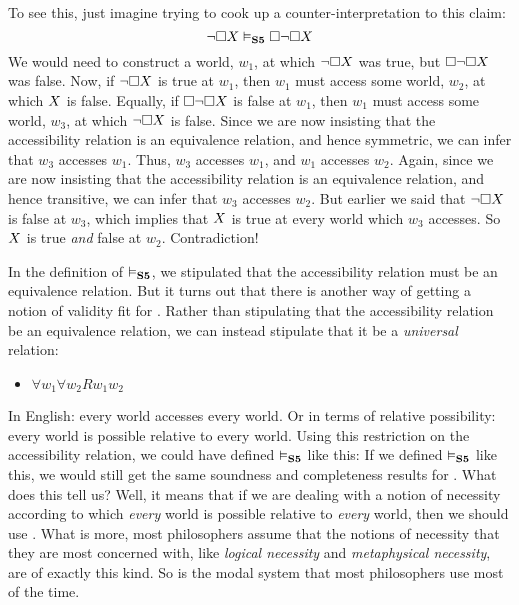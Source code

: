 To see this, just imagine trying to cook up a counter-interpretation to this claim:
\[
	\neg\Box X \vDash_{\mathbf{S5}}  \Box \neg\Box X
\]
We would need to construct a world, $w_1$, at which $\neg\Box X$ was true, but $\Box \neg\Box X$ was false. 
Now, if $\neg\Box X$ is true at $w_1$, then $w_1$ must access some world, $w_2$, at which $X$ is false. Equally, if $\Box \neg\Box X$ is false at $w_1$, then $w_1$ must access some world, $w_3$, at which $\neg\Box X$ is false. Since we are now insisting that the accessibility relation is an equivalence relation, and hence symmetric, we can infer that $w_3$ accesses $w_1$. Thus, $w_3$ accesses $w_1$, and $w_1$ accesses $w_2$. Again, since we are now insisting that the accessibility relation is an equivalence relation, and hence transitive, we can infer that $w_3$ accesses $w_2$. But earlier we said that $\neg\Box X$ is false at $w_3$, which implies that $X$ is true at every world which $w_3$ accesses. So $X$ is true \emph{and} false at $w_2$. Contradiction!

In the definition of $\vDash_{\mathbf{S5}} $, we stipulated that the accessibility relation must be an equivalence relation. But it turns out that there is another way of getting a notion of validity fit for \mlSfive. Rather than stipulating that the accessibility relation be an equivalence relation, we can instead stipulate that it be a \emph{universal} relation:
\begin{itemize}
	\item $\forall w_1\forall w_2Rw_1w_2$
\end{itemize}
In English: every world accesses every world. Or in terms of relative possibility: every world is possible relative to every world. Using this restriction on the accessibility relation, we could have defined $\vDash_{\mathbf{S5}} $ like this:
If we defined $\vDash_{\mathbf{S5}} $ like this, we would still get the same soundness and completeness results for \mlSfive. What does this tell us? Well, it means that if we are dealing with a notion of necessity according to which \emph{every} world is possible relative to \emph{every} world, then we should use \mlSfive. What is more, most philosophers assume that the notions of necessity that they are most concerned with, like \emph{logical necessity} and \emph{metaphysical necessity}, are of exactly this kind. So \mlSfive{} is the modal system that most philosophers use most of the time.

